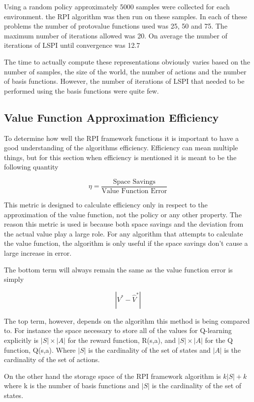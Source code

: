 \documentclass[12pt, letterpaper, final]{report}
\begin{document}
Using a random policy approximately 5000 samples were collected for
each environment. the RPI algorithm was then run on these samples. In
each of these problems the number of protovalue functions used was 25,
50 and 75. The maximum number of iterations allowed was 20. On
average the number of iterations of LSPI until convergence was 12.7

The time to actually compute these representations obviously varies
based on the number of samples, the size of the world, the number of
actions and the number of basis functions. However, the number of
iterations of LSPI that needed to be performed using the basis
functions were quite few. 


\subsection*{Value Function Approximation Efficiency}

To determine how well the RPI framework functions it is important to
have a good understanding of the algorithms efficiency. Efficiency can
mean multiple things, but for this section when efficiency is
mentioned it is meant to be the following quantity

\[
\eta = \frac{\text{Space Savings}}{\text{Value Function Error}}
\]

This metric is designed to calculate efficiency only in respect to the
approximation of the value function, not the policy or any other
property. The reason this metric is used is because both space savings and the
deviation from the actual value play a large role. For any algorithm
that attempts to calculate the value function, the algorithm is only
useful if the space savings don't cause a large increase in error. 

The bottom term will always remain the same as the value function
error is simply

\[
| V^{*} - \hat{V}^{*}|
\]

The top term, however, depends on the algorithm this method is being
compared to. For instance the space necessary to store all of the
values for Q-learning explicitly is $|S| \times |A|$ for the reward
function, R(s,a), and $|S|\times|A|$ for the Q function, Q(s,a). Where $|S|$ is
the cardinality of the set of states and $|A|$ is the cardinality of
the set of actions.

On the other hand the storage space of the RPI framework algorithm is 
$k|S|+k$ where k is the number of basis functions and $|S|$ is the
cardinality of the set of states.
\end{document}

